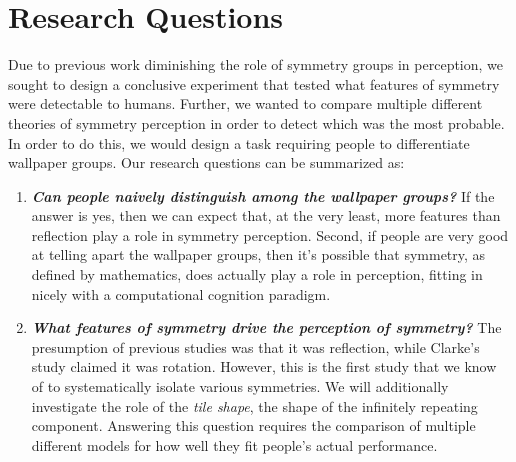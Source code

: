 \section{Research Questions}
Due to previous work diminishing the role of symmetry groups in perception, we sought to design a conclusive experiment that tested what features of symmetry were detectable to humans. Further, we wanted to compare multiple different theories of symmetry perception in order to detect which was the most probable. In order to do this, we would design a task requiring people to differentiate wallpaper groups. Our research questions can be summarized as:

\begin{enumerate}
\item {\textbf{\textit{Can people naively distinguish among the wallpaper groups?}} If the answer is yes, then we can expect that, at the very least, more features than reflection play a role in symmetry perception. Second, if people are very good at telling apart the wallpaper groups, then it's possible that symmetry, as defined by mathematics, does actually play a role in perception, fitting in nicely with a computational cognition paradigm.}
\item {\textbf{\textit{What features of symmetry drive the perception of symmetry?}} The presumption of previous studies was that it was reflection, while Clarke's study claimed it was rotation. However, this is the first study that we know of to systematically isolate various symmetries. We will additionally investigate the role of the \textit{tile shape}, the shape of the infinitely repeating component. Answering this question requires the comparison of multiple different models for how well they fit people's actual performance.}
\end{enumerate}